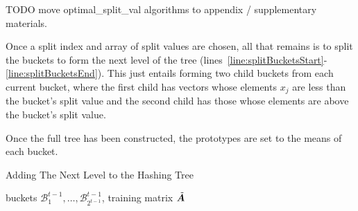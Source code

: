 TODO move optimal\_split\_val algorithms to appendix / supplementary materials.

Once a split index and array of split values are chosen, all that remains is to split the buckets to form the next level of the tree (lines~\ref{line:splitBucketsStart}-\ref{line:splitBucketsEnd}). This just entails forming two child buckets from each current bucket, where the first child has vectors whose elements $x_j$ are less than the bucket's split value and the second child has those whose elements are above the bucket's split value.

Once the full tree has been constructed, the prototypes are set to the means of each bucket.

\begin{algorithm}[h]
\caption{Adding The Next Level to the Hashing Tree} \label{algo:learnTree}
\begin{algorithmic}[1]
     buckets $\mathcal{B}^{t-1}_1,\ldots,\mathcal{B}^{t-1}_{2^{t-1}}$, training matrix $\tilde{\bm{A}}$

    \label{line:dimHeuristic}
     \label{line:dimEvalStart}
          
         
              
              
        \ENDFOR
        \ENDIF
    \ENDFOR \label{line:dimEvalStart}

     \label{line:splitBucketsStart}
    \ENDFOR \label{line:splitBucketsEnd}
\end{algorithmic}
\end{algorithm}


